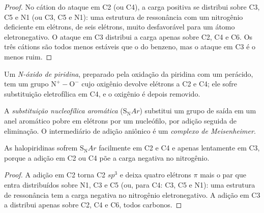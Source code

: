 \begin{proof}
No cátion do ataque em C2 (ou C4), a carga positiva se distribui sobre C3, C5
e N1 (ou C3, C5 e N1): uma estrutura de ressonância com um nitrogênio deficiente em elétrons,
de seis elétrons, muito desfavorável para um átomo eletronegativo. O ataque
em C3 distribui a carga apenas sobre C2, C4 e C6. Os três cátions são todos menos estáveis
que o do benzeno, mas o ataque em C3 é o menos ruim.
\end{proof}

\begin{definition}\label{def:b3:heterocycles:n-oxide}
Um \emph{N-óxido de piridina}, preparado pela oxidação da piridina
com um perácido, tem um grupo $\mathrm{N^+{-}O^-}$ cujo oxigênio devolve elétrons a C2
e C4; ele sofre substituição eletrofílica em C4, e o oxigênio é depois
removido.
\end{definition}

\begin{definition}\label{def:b3:heterocycles:snar}
A \emph{substituição nucleofílica aromática}
($\mathrm S_\mathrm NAr$) substitui um grupo de saída em um anel aromático pobre em elétrons
por um nucleófilo, por adição seguida de eliminação. O intermediário de adição
aniônico é um \emph{complexo de Meisenheimer}.
\end{definition}

\begin{proposition}\label{prop:b3:heterocycles:snar-positions}
As halopiridinas sofrem $\mathrm S_\mathrm NAr$ facilmente em C2 e C4 e apenas lentamente em C3,
porque a adição em C2 ou C4 põe a carga negativa no nitrogênio.
\end{proposition}

\begin{proof}
A adição em C2 torna C2 $sp^3$ e deixa quatro elétrons $\pi$ mais o par que entra
distribuídos sobre N1, C3 e C5 (ou, para C4: C3, C5 e N1): uma estrutura de ressonância tem a
carga negativa no nitrogênio eletronegativo. A adição em C3 a distribui apenas sobre
C2, C4 e C6, todos carbonos.
\end{proof}

